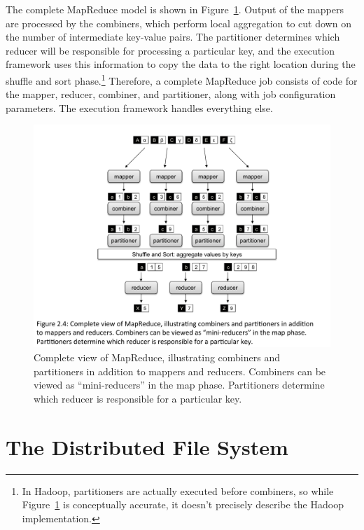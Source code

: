 The complete MapReduce model is shown in
Figure~\ref{figure:chapter2:MapReduce-complete}.  Output of the
mappers are processed by the combiners, which perform local
aggregation to cut down on the number of intermediate key-value pairs.
The partitioner determines which reducer will be responsible for
processing a particular key, and the execution framework uses this
information to copy the data to the right location during the shuffle
and sort phase.\footnote{In Hadoop, partitioners are actually executed
before combiners, so while
Figure~\ref{figure:chapter2:MapReduce-complete} is conceptually
accurate, it doesn't precisely describe the Hadoop implementation.}
Therefore, a complete MapReduce job consists of code for the mapper,
reducer, combiner, and partitioner, along with job configuration
parameters.  The execution framework handles everything else.

\begin{figure}[t]
\begin{center}
\includegraphics[scale=0.6]{figures/fig-ch2-MapReduce-complete.pdf}
\end{center}
\caption{Complete view of MapReduce, illustrating combiners and
  partitioners in addition to mappers and reducers.  Combiners can be
  viewed as ``mini-reducers'' in the map phase.  Partitioners
  determine which reducer is responsible for a particular key.}
\label{figure:chapter2:MapReduce-complete}
\end{figure}

\section{The Distributed File System}
\label{chapter2:dfs}


